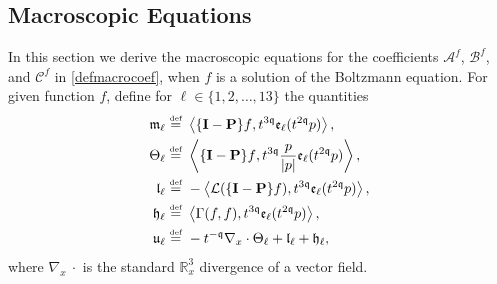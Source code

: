 \documentclass[reqno]{amsart}
\newcommand{\eqdef }{\overset{\mbox{\tiny{def}}}{=}}
\newcommand{\pv}{p}
\def\R{\mathbb R}
\newcommand{\irnp}[2]{\left\langle {#1},{#2} \right\rangle}
\newcommand{\qq}{\mathfrak{q}}
\newcommand{\tmq}{t^{-\qq}}
\newcommand{\tqq}{t^{2\qq}}
\newcommand{\tTq}{t^{3\qq}}
\newcommand{\linL}{\mathcal{L}}
\newcommand{\micro}{{\bf \{I- P\}}}
\newcommand{\highG}{\Theta}
\theoremstyle{definition}
\numberwithin{equation}{section}
\numberwithin{theorem}{section}
\begin{document}
\subsection{Macroscopic Equations}\label{derive.macroscopic}

In this section we derive the macroscopic equations for the coefficients \(\mathcal{A}^f\), \(\mathcal{B}^f\), and \(\mathcal{C}^f\) in \eqref{defmacrocoef}, when \(f\) is a solution of the Boltzmann equation. For given function \(f\), define for $\ell\in\{1,2,\ldots, 13\}$ the quantities
\begin{align}
\begin{aligned}\label{quantmacroscopeqns}
\mathfrak{m}_{\ell} \eqdef &~  \irnp{  \micro f}{\tTq \mathfrak{e}_{\ell}(\tqq \pv)},
\\
\highG_{\ell} \eqdef &~  \irnp{\micro f}{\tTq \frac{\pv}{| \pv|}\mathfrak{e}_{\ell}(\tqq \pv)},
\\
\mathfrak{l}_{\ell} \eqdef &~  -\irnp{\linL(\micro f)}{\tTq \mathfrak{e}_{\ell}(\tqq \pv)},
\\
\mathfrak{h}_{\ell}  \eqdef &~ 
\irnp{\Gamma(f,f)}{\tTq \mathfrak{e}_{\ell}(\tqq \pv)},
 \\
 \mathfrak{u}_{\ell} \eqdef &~  -\tmq \nabla_x \cdot \highG_{\ell}
 +\mathfrak{l}_{\ell}+\mathfrak{h}_{\ell},
 \end{aligned}
\end{align}
where \(\nabla_x ~\cdot\) is the standard \(\R^3_x\) divergence of a vector field.
\end{document}
